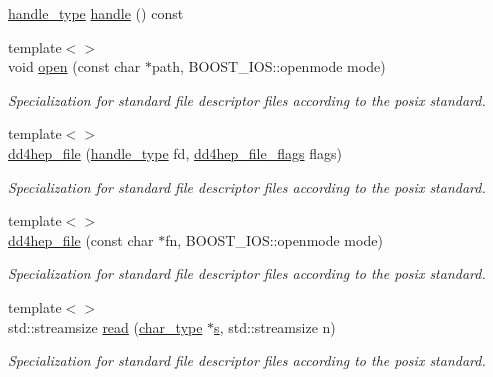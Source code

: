 \begin{DoxyCompactItemize}
\item 
\hyperlink{class_d_d4hep_1_1dd4hep__file_a4d79f8d433cd7831ff818691424cd6fc}{handle\+\_\+type} \hyperlink{class_d_d4hep_1_1dd4hep__file_af93150d3bdfa3b6ed9157ac158a18e95}{handle} () const
\item 
{\footnotesize template$<$$>$ }\\void \hyperlink{class_d_d4hep_1_1dd4hep__file_adc9dd31804b03c96f3fdb4525b97d96e}{open} (const char $\ast$path, B\+O\+O\+S\+T\+\_\+\+I\+O\+S\+::openmode mode)
\begin{DoxyCompactList}\small\item\em Specialization for standard file descriptor files according to the posix standard. \end{DoxyCompactList}\item 
{\footnotesize template$<$$>$ }\\\hyperlink{class_d_d4hep_1_1dd4hep__file_a3f83e5deac4f7d0bfe20b94d1a87ac7d}{dd4hep\+\_\+file} (\hyperlink{class_d_d4hep_1_1dd4hep__file_a4d79f8d433cd7831ff818691424cd6fc}{handle\+\_\+type} fd, \hyperlink{namespace_d_d4hep_a31d19f9b0ce567067d2897fbda1761e5}{dd4hep\+\_\+file\+\_\+flags} flags)
\begin{DoxyCompactList}\small\item\em Specialization for standard file descriptor files according to the posix standard. \end{DoxyCompactList}\item 
{\footnotesize template$<$$>$ }\\\hyperlink{class_d_d4hep_1_1dd4hep__file_a5fd6e1774efbf1c77ab299d32d89b2d5}{dd4hep\+\_\+file} (const char $\ast$fn, B\+O\+O\+S\+T\+\_\+\+I\+O\+S\+::openmode mode)
\begin{DoxyCompactList}\small\item\em Specialization for standard file descriptor files according to the posix standard. \end{DoxyCompactList}\item 
{\footnotesize template$<$$>$ }\\std\+::streamsize \hyperlink{class_d_d4hep_1_1dd4hep__file_ac00bb0ccc6724f941f071fb9d2ea76c4}{read} (\hyperlink{class_d_d4hep_1_1dd4hep__file_aef4242f7f2fe15a59f7bf7a8f6ba24d5}{char\+\_\+type} $\ast$\hyperlink{_volumes_8cpp_a17ca6bfc8040d695d3cada22a4763d40}{s}, std\+::streamsize n)
\begin{DoxyCompactList}\small\item\em Specialization for standard file descriptor files according to the posix standard. \end{DoxyCompactList}\item 

\end{DoxyCompactItemize}
